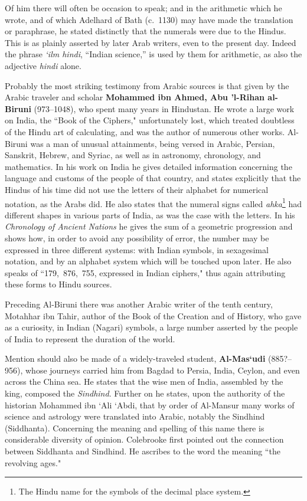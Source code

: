 \documentclass[11pt,a4paper]{article}
\begin{document}
Of him there will often be occasion to speak; and in the arithmetic which he wrote, and of which Adelhard of Bath (c.~1130) may have made the translation or paraphrase, he stated distinctly that the numerals were due to the Hindus. This is as plainly asserted by later Arab writers, even to the present day. Indeed the phrase \textit{`ilm hindi}, ``Indian science,'' is used by them for arithmetic, as also the adjective \textit{hindi} alone.

Probably the most striking testimony from Arabic sources is that given by the Arabic traveler and scholar \textbf{Mohammed ibn Ahmed, Abu 'l-Rihan al-Biruni} (973--1048), who spent many years in Hindustan. He wrote a large work on India, the ``Book of the Ciphers," unfortunately lost, which treated doubtless of the Hindu art of calculating, and was the author of numerous other works. Al-Biruni was a man of unusual attainments, being versed in Arabic, Persian, Sanskrit, Hebrew, and Syriac, as well as in astronomy, chronology, and mathematics. In his work on India he gives detailed information concerning the language and customs of the people of that country, and states explicitly that the Hindus of his time did not use the letters of their alphabet for numerical notation, as the Arabs did. He also states that the numeral signs called \textit{ahka}\footnote{The Hindu name for the symbols of the decimal place system.} had different shapes in various parts of India, as was the case with the letters. In his \textit{Chronology of Ancient Nations} he gives the sum of a geometric progression and shows how, in order to avoid any possibility of error, the number may be expressed in three different systems: with Indian symbols, in sexagesimal notation, and by an alphabet system which will be touched upon later. He also speaks of ``179,~876,~755, expressed in Indian ciphers," thus again attributing these forms to Hindu sources.

Preceding Al-Biruni there was another Arabic writer of the tenth century, Motahhar ibn Tahir, author of the Book of the Creation and of History, who gave as a curiosity, in Indian (Nagari) symbols, a large number asserted by the people of India to represent the duration of the world.

Mention should also be made of a widely-traveled student, \textbf{Al-Mas`udi} (885?--956), whose journeys carried him from Bagdad to Persia, India, Ceylon, and even across the China sea. He states that the wise men of India, assembled by the king, composed the \textit{Sindhind}. Further on he states, upon the authority of the historian Mohammed ibn `Ali `Abdi, that by order of Al-Mansur many works of science and astrology were translated into Arabic, notably the Sindhind (Siddhanta). Concerning the meaning and spelling of this name there is considerable diversity of opinion. Colebrooke first pointed out the connection between Siddhanta and Sindhind. He ascribes to the word the meaning ``the revolving ages."
\end{document}
